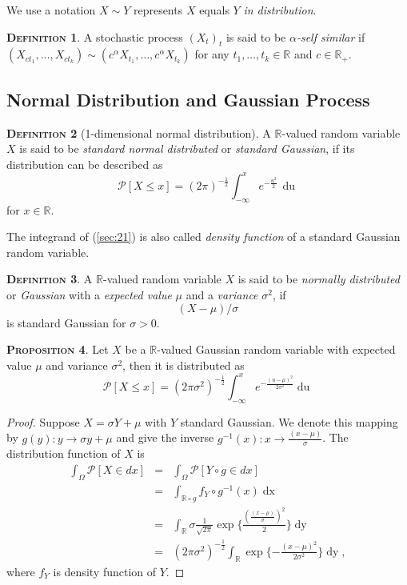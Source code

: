 \documentclass[a4paper, twoside, 11pt]{article}
\theoremstyle{definition}
\newtheorem{definition}{\scshape Definition}[section]
\newtheorem{proposition}[definition]{\scshape Proposition}
\newcommand{\sqbr}[1]{\left[ {#1} \right]}
\begin{document}
We use a notation $X \sim Y$ represents $X$ equals $Y$ \emph{in distribution}. 
\begin{definition}
  A stochastic process $(X_t)_{t}$ is said to be \emph{$\alpha$-self similar} if $(X_{ct_1},\dots,X_{ct_k}) \sim (c^\alpha X_{t_1},\dots, c^\alpha X_{t_k})$ for any $t_1,\dots, t_k \in \mathbb{R}$ and $c\in \mathbb{R}_{+}$.
\end{definition}

\subsection{Normal Distribution and Gaussian Process}
\begin{definition}[1-dimensional normal distribution]
  A $\mathbb{R}$-valued random variable $X$ is said to be \emph{standard normal distributed} or \emph{standard Gaussian}, if its distribution can be described as
  \begin{equation}
	\mathcal{P}\sqbr{X \le x} = (2\pi)^{-\frac{1}{2}}\int_{-\infty}^{x} e^{-\frac{u^2}{2}}\,\mathop{du}  
	\label{sec:21}
  \end{equation}
  for $x \in \mathbb{R}$.
\end{definition}
The integrand of (\ref{sec:21}) is also called \emph{density function} of a standard Gaussian random variable.

\begin{definition}
  A $\mathbb{R}$-valued random variable $X$ is said to be \emph{normally distributed} or \emph{Gaussian} with a \emph{expected value} $\mu$ and a \emph{variance} $\sigma^2$, if
\[
  (X-\mu) / \sigma
\]
is standard Gaussian for $\sigma>0$.
\end{definition}

\begin{proposition}
  Let $X$ be a $\mathbb{R}$-valued Gaussian random variable with expected value $\mu$ and variance $\sigma^2$, then it is distributed as
  \begin{equation*}
	\mathcal{P}[X\le x] = (2\pi\sigma^2)^{-\frac{1}{2}}\int_{-\infty}^x e^{-\frac{(u-\mu)^2}{2\sigma^2}}\mathop{du}
  \end{equation*}
\end{proposition}

\begin{proof}
  Suppose $X = \sigma Y + \mu$ with $Y$ standard Gaussian. We denote this mapping by $g(y) : y \rightarrow \sigma y + \mu$ and give the inverse $g^{-1}(x) : x \rightarrow \frac{(x-\mu)}{\sigma}$. The distribution function of $X$ is 
  \begin{eqnarray*}
	\int_\Omega \mathcal{P}[X \in dx] &=& \int_\Omega \mathcal{P}[Y \circ g \in dx] \\
	&=& \int_{\mathbb{R}\circ g} f_Y \circ g^{-1}(x) \mathop{dx}\\
	&=& \int_{\mathbb{R}} \sigma \frac{1}{\sqrt{2\pi}} \exp\{\frac{(\frac{(x-\mu)}{\sigma})^2}{2}\} \mathop{dy}\\
	&=&  (2\pi\sigma^2)^{-\frac{1}{2}}\int_{\mathbb{R}} \exp\{-\frac{(x-\mu)^2}{2\sigma^2}\}\mathop{dy} ,
  \end{eqnarray*}
 where $f_Y$ is density function of $Y$.
\end{proof}
\end{document}
